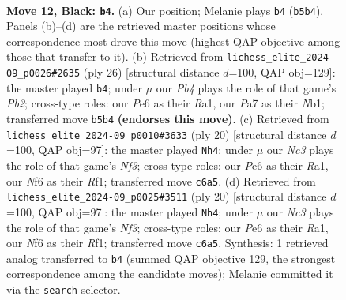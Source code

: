 \documentclass[11pt]{article}
\begin{document}
\begin{figure}[p]
\label{fig:thought-m21}
\end{figure}

\clearpage

\begin{figure}[p]\centering
\begin{subfigure}{0.46\textwidth}\centering
\resizebox{\linewidth}{!}{%
\newchessgame
\chessboard[
  setfen={1rb1r1k1/p1p1qppp/2n1pn2/1pPp4/3P4/1QB1PNP1/PP3P1P/R3KB1R b Q - 3 12},
  showmover=false,
  pgfstyle=straightmove, color=movearrow, markmove={b5-b4}
]}
\caption{}
\end{subfigure}\hfill
\begin{subfigure}{0.46\textwidth}\centering
\resizebox{\linewidth}{!}{%
\newchessgame
\chessboard[
  setfen={r3k2r/pp2bpp1/1qn1b2p/3pPp2/3P3P/P4N2/1P3PP1/RNBQR1K1 w kq - 1 14},
  showmover=false,
  pgfstyle=straightmove, color=movearrow, markmove={b2-b4}
]}
\caption{}
\end{subfigure}
\\[4pt]
\begin{subfigure}{0.46\textwidth}\centering
\resizebox{\linewidth}{!}{%
\newchessgame
\chessboard[
  setfen={r1bqr1k1/p1pn2pp/1pp2p2/2b1p3/2N1P3/P2P1N2/1PPB1PPP/R2Q1RK1 w - - 0 11},
  showmover=false,
  pgfstyle=straightmove, color=movearrow, markmove={f3-h4}
]}
\caption{}
\end{subfigure}\hfill
\begin{subfigure}{0.46\textwidth}\centering
\resizebox{\linewidth}{!}{%
\newchessgame
\chessboard[
  setfen={r1bqr1k1/p1pn2pp/1pp2p2/2b1p3/2N1P3/P2P1N2/1PPB1PPP/R2Q1RK1 w - - 0 11},
  showmover=false,
  pgfstyle=straightmove, color=movearrow, markmove={f3-h4}
]}
\caption{}
\end{subfigure}
\caption{\textbf{Move 12, Black: \texttt{b4}.} (a) Our position; Melanie plays \texttt{b4} (\texttt{b5b4}). Panels (b)--(d) are the retrieved master positions whose correspondence most drove this move (highest QAP objective among those that transfer to it). (b) Retrieved from \texttt{lichess\_elite\_2024-09\_p0026\#2635} (ply 26) [structural distance $d$=100, QAP obj=129]: the master played \texttt{b4}; under $\mu$ our \emph{Pb4} plays the role of that game's \emph{Pb2}; cross-type roles: our \emph{P}e6 as their \emph{R}a1, our \emph{P}a7 as their \emph{N}b1; transferred move \texttt{b5b4} \textbf{(endorses this move)}. (c) Retrieved from \texttt{lichess\_elite\_2024-09\_p0010\#3633} (ply 20) [structural distance $d$=100, QAP obj=97]: the master played \texttt{Nh4}; under $\mu$ our \emph{Nc3} plays the role of that game's \emph{Nf3}; cross-type roles: our \emph{P}e6 as their \emph{R}a1, our \emph{N}f6 as their \emph{R}f1; transferred move \texttt{c6a5}. (d) Retrieved from \texttt{lichess\_elite\_2024-09\_p0025\#3511} (ply 20) [structural distance $d$=100, QAP obj=97]: the master played \texttt{Nh4}; under $\mu$ our \emph{Nc3} plays the role of that game's \emph{Nf3}; cross-type roles: our \emph{P}e6 as their \emph{R}a1, our \emph{N}f6 as their \emph{R}f1; transferred move \texttt{c6a5}. Synthesis: 1 retrieved analog transferred to \texttt{b4} (summed QAP objective 129, the strongest correspondence among the candidate moves); Melanie committed it via the \texttt{search} selector.}

\end{figure}
\end{document}
